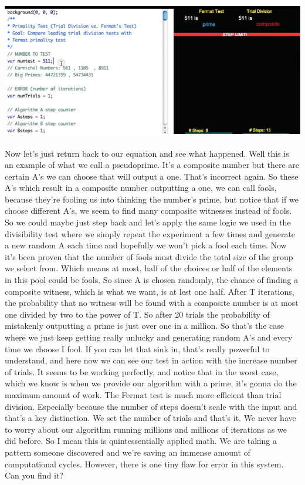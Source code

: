 \documentclass{report}
\begin{document}
  \begin{center}
 	\includegraphics[scale=1]{92.png}
 \end{center}
 Now let's just return back to our equation and see what happened. Well this is an example of what we call a pseudoprime. It's a composite number but there are certain A's we can choose that will output a one. That's incorrect again. So these A's which result in a composite number outputting a one, we can call fools, because they're fooling us into thinking the number's prime, but notice that if we choose different A's, we seem to find many composite witnesses instead of fools. So we could maybe just step back and let's apply the same logic we used in the divisibility test where we simply repeat the experiment a few times and generate a new random A each time and hopefully we won't pick a fool each time. Now it's been proven that the number of fools must divide the total size of the group we select from. Which means at most, half of the choices or half of the elements in this pool could be fools. So since A is chosen randomly, the chance of finding a composite witness, which is what we want, is at lest one half. After T iterations, the probability that no witness will be found with a composite number is at most one divided by two to the power of T. So after 20 trials the probability of mistakenly outputting a prime is just over one in a million. So that's the case where we just keep getting really unlucky and generating random A's and every time we choose I fool. If you can let that sink in, that's really powerful to understand, and here now we can see our test in action with the increase number of trials. It seems to be working perfectly, and notice that in the worst case, which we know is when we provide our algorithm with a prime, it's gonna do the maximum amount of work. The Fermat test is much more efficient than trial division. Especially because the number of steps doesn't scale with the input and that's a key distinction. We set the number of trials and that's it. We never have to worry about our algorithm running millions and millions of iterations as we did before. So I mean this is quintessentially applied math. We are taking a pattern someone discovered and we're saving an immense amount of computational cycles. However, there is one tiny flaw for error in this system. Can you find it?
\end{document}
